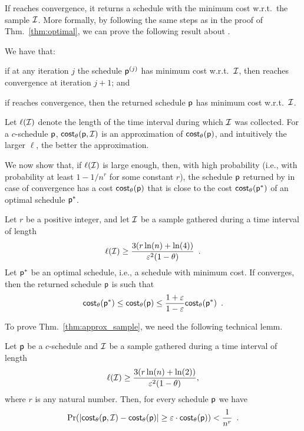 If \algonameapx reaches convergence, it returns a schedule with the minimum cost
w.r.t.~the sample $\mathcal{I}$. More formally, by following the same steps as in
the proof of Thm.~\ref{thm:optimal}, we can prove the following result about
\algonameapx.

\begin{lemma}\label{lem:optimal_sample}
	We have that:
	\begin{enumerate*}
		\item if at any iteration $j$ the schedule $\mathsf{p}^{(j)}$ has minimum
			cost w.r.t.~$\mathcal{I}$, then \algonameapx reaches convergence at
			iteration $j+1$; and
		\item if \algonameapx reaches convergence, then the returned schedule
			$\mathsf{p}$ has minimum cost w.r.t.~$\mathcal{I}$.
	\end{enumerate*}
\end{lemma}

Let $\ell(\mathcal{I})$ denote the length of the time interval during which
$\mathcal{I}$ was collected. For a $c$-schedule $\mathsf{p}$,
$\mathsf{cost}_\theta(\mathsf{p},\mathcal{I})$ is an approximation of $\mathsf{cost}_\theta(\mathsf{p})$,
and intuitively the larger $\ell$, the better the approximation.

We now show that, if $\ell(\mathcal{I})$ is large enough, then, with high
probability (i.e., with probability at least $1-1/n^r$ for some constant $r$),
the schedule $\mathsf{p}$ returned by \algonameapx in case of convergence has a cost
$\mathsf{cost}_\theta(\mathsf{p})$ that is close to the cost $\mathsf{cost}_\theta(\mathsf{p}^*)$ of an optimal
schedule $\mathsf{p}^*$.

\begin{theorem}\label{thm:approx_sample}
	Let $r$ be a positive integer, and let $\mathcal{I}$ be a sample gathered during a
	time interval of length
	\begin{equation}\label{eq:samplesize}
		\ell(\mathcal{I}) \geq
		\frac{3(r\ln(n)+\ln(4))}{\varepsilon^2(1-\theta)}\enspace.
	\end{equation}
	Let $\mathsf{p}^*$ be an optimal schedule, i.e., a schedule with minimum cost. If \algonameapx converges, then the returned schedule
	$\mathsf{p}$ is such that
	\[
		\mathsf{cost}_\theta(\mathsf{p}^*)\le\mathsf{cost}_\theta(\mathsf{p})\le\frac{1+\varepsilon}{1-\varepsilon}\mathsf{cost}_\theta(\mathsf{p}^*)\enspace.
	\]
\end{theorem}

To prove Thm.~\ref{thm:approx_sample}, we need the following technical lemm.

\begin{lemma}\label{lem:chernoffcost}
	Let $\mathsf{p}$ be a $c$-schedule and $\mathcal{I}$ be a sample gathered during a
	time interval of length
	\begin{align}\label{eq:samp_cond}
		\ell(\mathcal{I}) \geq \frac{3(r\ln(n)+\ln(2))}{\varepsilon^2(1-\theta)},
	\end{align}
	where $r$ is any natural number. Then, for every schedule $\mathsf{p}$ we have
	\[
		\Pr(|\mathsf{cost}_\theta(\mathsf{p},\mathcal{I}) - \mathsf{cost}_\theta(\mathsf{p})|\geq
		\varepsilon\cdot\mathsf{cost}_\theta(\mathsf{p})) < \frac{1}{n^r}\enspace .
	\]
\end{lemma}

